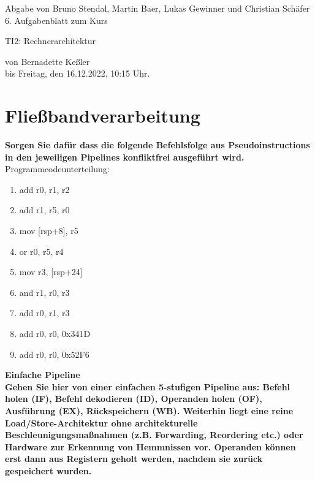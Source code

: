 \documentclass[11pt]{article}
\newcommand{\VORLESUNG}{TI2: Rechnerarchitektur}
\newcommand{\STUDENTS}{Bruno Stendal, Martin Baer, Lukas Gewinner und Christian Schäfer}
\newcommand{\STAFF}{Bernadette Keßler}
\newcommand{\ASSIGNMENT}{6}
\newcommand{\DELIVER}{Freitag, den 16.12.2022, 10:15 Uhr}
\newcommand{\aufgabe}[1]{\item{\bf #1}}
\begin{document}
\ofoot{\pagemark}
\begin{center}
    Abgabe von \STUDENTS{}\\
 \ASSIGNMENT{}. Aufgabenblatt  zum Kurs 
\vspace*{0.2cm}

{\Large \VORLESUNG{}}

{\small von \STAFF{} \\ bis \DELIVER{}.}
\vspace*{0.5cm}\\
\end{center}

\section{Fließbandverarbeitung}
\aufgabe{Sorgen Sie dafür dass die folgende Befehlsfolge aus Pseudoinstructions in den jeweiligen Pipelines konfliktfrei ausgeführt wird.}\\
Programmcodeunterteilung:
\begin{enumerate}
    \item add r0, r1, r2
    \item add r1, r5, r0
    \item mov [rsp+8], r5
    \item or r0, r5, r4
    \item mov r3, [rsp+24]
    \item and r1, r0, r3
    \item add r0, r1, r3
    \item add r0, r0, 0x341D
    \item add r0, r0, 0x52F6
\end{enumerate}
\aufgabe{Einfache Pipeline\\ Gehen Sie hier von einer einfachen 5-stufigen Pipeline aus: Befehl holen (IF), Befehl dekodieren (ID), Operanden holen (OF), Ausführung (EX), Rückspeichern (WB). Weiterhin liegt eine reine Load/Store-Architektur ohne architekturelle Beschleunigungsmaßnahmen (z.B. Forwarding, Reordering etc.) oder Hardware zur Erkennung von Hemmnissen vor. Operanden können erst dann aus Registern geholt werden, nachdem sie zurück gespeichert wurden.}\\
\end{document}
